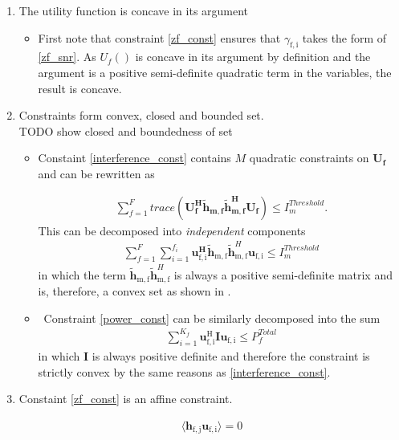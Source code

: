 \documentclass[12pt]{article}
\begin{document}
\begin{enumerate}
\item The utility function is concave in its argument 
\begin{itemize}
\item 
First note that constraint \eqref{zf_const}  ensures that $\gamma_{\mathrm{f,i}}$ takes the form of \eqref{zf_snr}.
As $U_f() $ is concave in its argument by definition and the argument is a positive semi-definite quadratic term in the variables, the result is concave.
\end{itemize}

\item
Constraints form convex, closed and bounded set. 
\\
TODO show closed and boundedness of set

\begin{itemize}

\item
	Constaint \eqref{interference_const} contains $M$ quadratic constraints on $\mathbf{U_f}$ and 
	can be rewritten as 

\begin{gather*}
	\sum_{f=1}^F
	trace(\mathbf{U_f^H} \mathbf{\tilde{h}_{m,f}} \mathbf{\tilde{h}_{m,f}^H} \mathbf{U_f} )\leq 
	I^{Threshold}_{m}.
\end{gather*}
This can be decomposed into \textit{independent} components 
	\begin{gather*}
	\sum_{f=1}^F
	\sum_{i=1}^{f_i}
	\mathbf{u_{\mathrm{f,i}}^H}\mathbf{\tilde{h}_{\mathrm{m,f}}} \mathbf{\tilde{h}}_{\mathrm{m,f}}^H
	\mathbf{u_{\mathrm{f,i}}} \leq I^{Threshold}_{m}
	\end{gather*}
in which the term $ \mathbf{\tilde{h}_{\mathrm{m,f}}} \mathbf{\tilde{h}}_{\mathrm{m,f}}^H$ is always a positive semi-definite matrix and is, therefore, a convex set as shown in 
\cite[p.8,9]{BoV:04}. 


\item \
	Constraint \eqref{power_const} can be similarly decomposed into the sum
	\begin{gather*}
		\sum_{i=1}^{K_f}\mathbf{u_{\mathrm{f,i}}^{\mathrm{H}}} \mathbf{I} 		
		\mathbf{u_{\mathrm{f,i}}} \leq  P^{Total}_{f}
	\end{gather*}
	in which $\mathbf{I}$ is always positive definite and 			
	therefore the constraint is strictly convex by the same 		
	reasons as \eqref{interference_const}.
\end{itemize}

\item 
	Constaint \eqref{zf_const} is an affine constraint. 

		\begin{gather*}
		\langle \mathbf{h_{\mathrm{f,j}}}\mathbf{u_{\mathrm{f,i}}} \rangle =0
		\end{gather*}

\end{enumerate}
\end{document}
